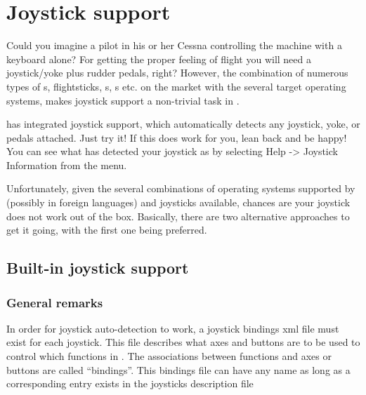 \section{Joystick support\label{joysticksupp}}
Could you imagine a pilot in his or her Cessna controlling the machine with
a keyboard alone? For getting the proper feeling of flight you will need a
joystick/yoke plus rudder pedals, right? However, the combination of
numerous types of s, flightsticks, s,
s etc. on the market with the several target operating systems,
makes joystick support a non-trivial task in \FlightGear{}.

\FlightGear{} has integrated joystick support, which automatically detects
any joystick, yoke, or pedals attached. Just try it! If this does work for
you, lean back and be happy! You can see what \FlightGear{} has detected your
joystick as by selecting Help -> Joystick Information from the menu.

Unfortunately, given the several combinations of operating systems supported
by \FlightGear{} (possibly in foreign languages) and joysticks available,
chances are your joystick does not work out of the box. Basically, there are
two alternative approaches to get it going, with the first one being
preferred.


\subsection{Built-in joystick support\label{joystickbuiltin}}

\subsubsection{General remarks\label{generalremarks}}
In order for joystick auto-detection to work, a joystick bindings xml file
must exist for each joystick. This file describes what axes and buttons are
to be used to control which functions in \FlightGear{}.  The associations
between functions and axes or buttons are called ``bindings''.  This
bindings file can have any name as long as a corresponding entry exists in
the joysticks description file
\medskip

